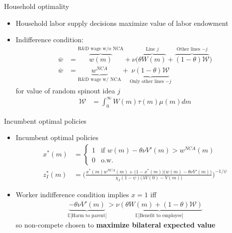 \documentclass[english,usenames,dvipsnames]{beamer}
\begin{document}
\begin{frame}{Household optimality}
\begin{itemize}
\item Household labor supply decisions maximize value of labor endowment
\item Indifference condition: 
\begin{align*}
\bar{w} &= \overbrace{w(m)}^{\textrm{R\&D wage w/o NCA}} + \nu \Big(\overbrace{\theta W(m)}^{\textrm{Line $j$}} + \overbrace{(1-\theta) \mathcal{W}}^{\textrm{Other lines $-j$}} \Big) \\
\bar{w} &= \underbrace{w^{NCA}}_{\textrm{R\&D wage w/ NCA}} + \underbrace{\nu (1-\theta) \mathcal{W}}_{\textrm{Only other lines $-j$}}
\end{align*}
for value of random spinout idea $j$
\begin{align*}
\mathcal{W} &= \int_0^{\infty} W(m) \tau(m) \mu(m) dm
\end{align*}
\end{itemize}
\end{frame}

\begin{frame}{Incumbent optimal policies}
\begin{itemize}
\item Incumbent optimal policies
\small
\begin{align*}
x^*(m) &= 
\begin{cases}
1 & \textrm{if } w(m) - \theta \nu V'(m) > w^{NCA}(m) \\
0 & \textrm{o.w.}
\end{cases}\\ 
z_I^*(m) &= \Bigg( \frac{x^*(m) w^{NCA}(m) + \Big(1-x^*(m)\Big) \Big(w(m) - \theta \nu V'(m)\Big)}{\chi_I (1-\psi) \Big(\lambda V(0) - V(m) \Big)} \Bigg)^{-1/\psi} 
\end{align*}
\normalsize
\item Worker indifference condition implies $x = 1$ iff
\begin{align*}
\underbrace{- \theta \nu V'(m)}_{\textrm{$\mathbb{E}$[Harm to parent]}} > \underbrace{\nu (\theta W(m) + (1-\theta) \mathcal{W})}_{\textrm{$\mathbb{E}$[Benefit to employee]}}  
\end{align*}
so non-compete chosen to \textbf{\alert{maximize bilateral expected value}}
\end{itemize}
\end{frame}
\end{document}
